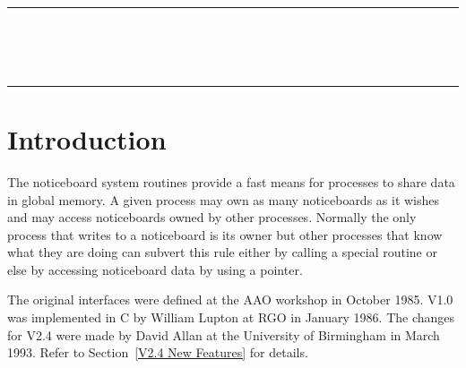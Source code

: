\newcommand{\sstbugs}[1]{\item[Bugs:] #1}

\newcommand{\sstitemlist}[1]{
  \mbox{} \\
  \vspace{-3.5ex}
  \begin{itemize}
     #1
  \end{itemize}
}

\newcommand{\sstitem}{\item}



\newpage
\markright{\stardocname}
\renewcommand{\thepage}{\arabic{page}}
\setcounter{page}{1}

\null\vspace {5mm}
\begin {center}
\rule{80mm}{0.5mm} \\ [1ex]
{\Large\bf \stardoctitle \\ [2.5ex]
           \stardocversion} \\ [2ex]
\rule{80mm}{0.5mm}
\end{center}
\vspace{30mm}


\section {Introduction}



      The noticeboard system routines provide a fast means for processes to
      share data in global memory. A given process may own as many noticeboards
      as it wishes and may access noticeboards owned by other processes.
      Normally the only process that writes to a noticeboard is its owner but
      other processes that know what they are doing can subvert this rule
      either by calling a special routine or else by accessing noticeboard data
      by using a pointer.

      The original interfaces were defined at the {AAO} workshop in October
      1985. {V1.0} was implemented in C by William Lupton at {RGO} in January
      1986. The changes for {V2.4} were made by David Allan at the University
      of Birmingham in March 1993.
      Refer to Section~\ref {V2.4 New Features} for details.

